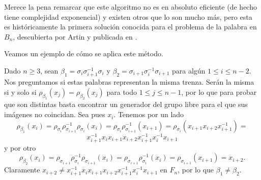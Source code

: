 \documentclass[TFG.tex]{subfiles}
\begin{document}
Merece la pena remarcar que este algoritmo no es en absoluto eficiente (de hecho tiene complejidad exponencial) y existen otros que lo son mucho más, pero esta es históricamente la primera solución conocida para el problema de la palabra en $B_n$, descubierta por Artin y publicada en \cite{ArtinA}.

Veamos un ejemplo de cómo se aplica este método.
\begin{ej}
Dado $n\geq 3$, sean $\beta_1=\sigma_i\sigma_{i+1}^{-1}\sigma_i$ y $\beta_2=\sigma_{i+1}\sigma_i^{-1}\sigma_{i+1}$ para algún $1\leq i\leq n-2$. Nos preguntamos si estas palabras representan la misma trenza. Serán la misma si y solo si $\rho_{\beta_1}(x_j)=\rho_{\beta_2}(x_j)$ para todo $1\leq j\leq n-1$, por lo que para probar que son distintas basta encontrar un generador del grupo libre para el que sus imágenes no coincidan. Sea pues $x_i$. Tenemos por un lado
$$\rho_{\beta_1}(x_i)=\rho_{\sigma_i}\rho^{-1}_{\sigma_{i+1}}\rho_{\sigma_i}(x_i)=\rho_{\sigma_i}\rho^{-1}_{\sigma_{i+1}}(x_{i+1})=\rho_{\sigma_i}(x_{i+1}x_{i+2}x_{i+1}^{-1})=$$
$$x_{i+1}^{-1}x_ix_{i+1}x_{i+2}x_{i+1}^{-1}x_i^{-1}x_{i+1}$$
y por otro
$$\rho_{\beta_2}(x_i)=\rho_{\sigma_{i+1}}\rho_{\sigma_i}^{-1}\rho_{\sigma_{i+1}}(x_i)=\rho_{\sigma_{i+1}}\rho_{\sigma_i}^{-1}(x_i)=\rho_{\sigma_{i+1}}(x_{i+1})=x_{i+2}.$$
Claramente $x_{i+2}\neq x_{i+1}^{-1}x_ix_{i+1}x_{i+2}x_{i+1}^{-1}x_i^{-1}x_{i+1}$ en $F_n$, por lo que $\beta_1\neq\beta_2$.
\end{ej}
\end{document}
